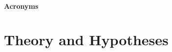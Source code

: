 \documentclass[listof=flat,a4paper,12pt,headsepline,bibliography=totoc,listof=totoc,index=totoc,cleardoublepage=empty,numbers=noenddot,headings=normal]{scrreprt}
\begin{document}



\renewcommand{\thepage}{\roman{page}}
\setcounter{page}{1}


\onehalfspacing

\renewcommand\contentsname{Table of Contents}


\tableofcontents

\bigskip
\bigskip

\clearpage

\vspace{5cm}
\begin{LARGE}
\textbf{Acronyms}
\end{LARGE}
\vspace{1cm}



\clearpage


\begingroup
\doublespacing

\renewcommand{\cleardoublepage}{}
\renewcommand{\clearpage}{}



\chapter{Theory and Hypotheses}
\label{ch:theory}







\endgroup






\end{document}

